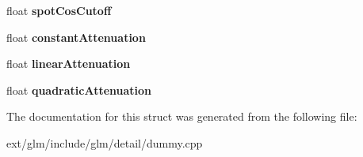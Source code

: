 \begin{DoxyCompactItemize}
\item 
\hypertarget{structlight_a25376f0a1e32235d50ef14edfa18bfb3}{float {\bfseries spot\-Cos\-Cutoff}}\label{structlight_a25376f0a1e32235d50ef14edfa18bfb3}

\item 
\hypertarget{structlight_a788e3a9fbc05cd748dd6a181b6043892}{float {\bfseries constant\-Attenuation}}\label{structlight_a788e3a9fbc05cd748dd6a181b6043892}

\item 
\hypertarget{structlight_aea11b1222a4d5c42f5d69e31751e6fac}{float {\bfseries linear\-Attenuation}}\label{structlight_aea11b1222a4d5c42f5d69e31751e6fac}

\item 
\hypertarget{structlight_afe2993ec0463d57b374b8f5a27f2dfa7}{float {\bfseries quadratic\-Attenuation}}\label{structlight_afe2993ec0463d57b374b8f5a27f2dfa7}

\end{DoxyCompactItemize}


The documentation for this struct was generated from the following file\-:\begin{DoxyCompactItemize}
\item 
ext/glm/include/glm/detail/dummy.\-cpp\end{DoxyCompactItemize}
